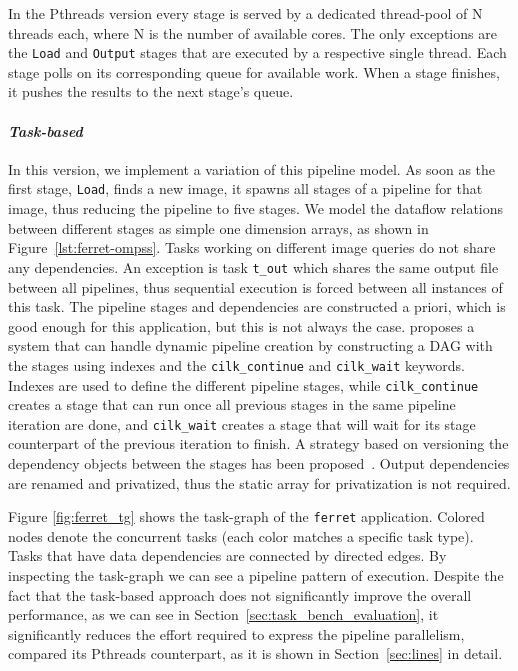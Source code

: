 {In the Pthreads version every stage is served by a dedicated thread-pool of N threads each, where N is the number of available cores.
The only exceptions are the \texttt{Load} and \texttt{Output} stages that are executed by a respective single thread.
Each stage polls on its corresponding queue for available work.  When a stage finishes,
it pushes the results to the next stage's queue. 

\paragraph{\textit{Task-based}}
In this version, we implement a variation of this pipeline model. As soon as the first
stage, \texttt{Load}, finds a new image, it spawns all stages of a pipeline for that
image, thus reducing the pipeline to five stages.  We model the dataflow relations between
different stages as simple one dimension arrays, as shown in
Figure~\ref{lst:ferret-ompss}.  Tasks working on different image queries do not share any
dependencies. An exception is task \texttt{t\_out} which shares the same output file
between all pipelines, thus sequential execution is forced between all instances of this
task.  The pipeline stages and dependencies are constructed a priori, which is good enough
for this application, but this is not always the case.
\cite{Lee:2013:OPP:2486159.2486174} proposes a system that can handle dynamic pipeline
creation by constructing a DAG with the stages using indexes and the
\texttt{cilk\_continue} and \texttt{cilk\_wait} keywords.  Indexes are used to define the
different pipeline stages, while \texttt{cilk\_continue} creates a stage that can run once
all previous stages in the same pipeline iteration are done, and \texttt{cilk\_wait}
creates a stage that will wait for its stage counterpart of the previous iteration to
finish.  A strategy based on versioning the dependency objects between the stages has been
proposed~\cite{Vandierendonck:2011:PPG:2001252.2001265}.  Output dependencies are renamed
and privatized, thus the static array for privatization is not required.  

Figure \ref{fig:ferret_tg} shows the task-graph of the \texttt{ferret} application.
Colored nodes denote the concurrent tasks (each color matches a specific task type).
Tasks that have data dependencies are connected by directed edges.  By inspecting the
task-graph we can see a pipeline pattern of execution.  Despite the fact that the
task-based approach does not significantly improve the overall performance, as we can see
in Section~\ref{sec:task_bench_evaluation}, it significantly reduces the effort required
to express the pipeline parallelism, compared its Pthreads counterpart, as it is shown in
Section~\ref{sec:lines} in detail.


}
